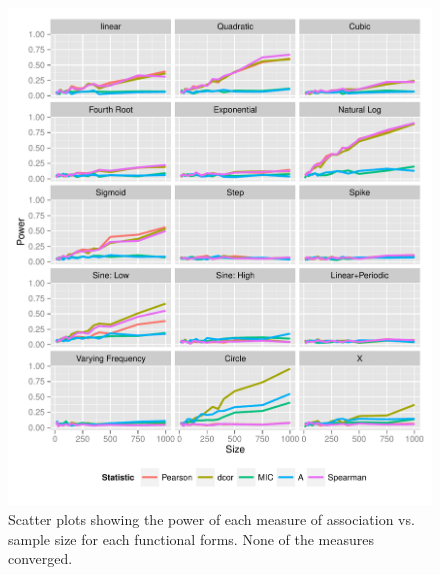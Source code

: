 \documentclass[a4paper, 12pt]{report}
\begin{document}
\begin{figure}[H]
\begin{centering}
\includegraphics[width=\textwidth]{powerSizeNoise30Beta25.pdf}
\caption{Scatter plots showing the power of each measure of association vs. sample size for each functional forms. None of the measures converged.} 
\label{F:powerSizeBN30}
\end{centering}
\end{figure}



%
%
\end{document}
